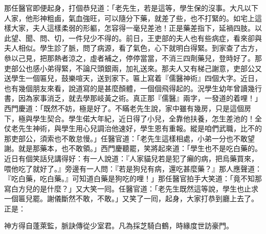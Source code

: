 那任醫官即便起身，打個恭兒道：「老先生，若是這等，學生保的沒事。大凡以下人家，他形神粗鹵，氣血強旺，可以隨分下藥，就差了些，也不打緊的。{}如宅上這樣大家，夫人這樣柔弱的形軀，怎容得一毫兒差池！正是藥差指下，延禍四肢。以此望、聞、問、切，一件兒少不得的。前日，王吏部的夫人也有些病症，看來卻與夫人相似。學生診了脈，問了病源，看了氣色，心下就明白得緊。到家查了古方，叅以己見，把那熱者涼之，虛者補之，停停當當，不消三四劑藥兒，登時好了。那吏部公也感小弟得緊，不論尺頭銀兩，加礼送來。那夫人又有梯己謝意，吏部公又送學生一個匾兒，鼓樂喧天，送到家下。匾上寫着『儒醫神術』四個大字。近日，也有幾個朋友來看，說道寫的是甚麼顏體，{}一個個飛得起的。況學生幼年曾讀幾行書，因為家事消乏，就去學那岐黃之術。真正那『儒醫』兩字，一發道的着哩！」{}西門慶道：「既然不妨，極是好了。不瞞老先生說，家中雖有幾房，只是這個房下，極與學生契合。學生偌大年紀，近日得了小兒，全靠他扶養，怎生差池的！全仗老先生神術，與學生用心兒調治他速好，學生恩有重報。縱是咱們武職，比不的那吏部公，{}須索也不敢怠慢。」任醫官道：「老先生這樣相處，小弟一分也不敢望謝。就是那藥本，也不敢領。」西門慶聽罷，笑將起來道：「學生也不是吃白藥的。近日有個笑話兒講得好：有一人說道：『人家貓兒若是犯了癩的病，把烏藥買來，喂他吃了就好了。』旁邊有一人問：『若是狗兒有病，還吃甚麼藥？』那人應聲道：『吃白藥，吃白藥。』可知道白藥是狗吃的哩！」那任醫官拍手大笑道：「竟不知那寫白方兒的是什麼？」又大笑一囘。任醫官道：「老先生既然這等說，學生也止求一個匾兒罷。謝儀斷然不敢，不敢。」又笑了一囘，起身，大家打恭到廳上去了。正是：

神方得自蓬萊監，脈訣傳從少室君。凡為採芝騎白鶴，時緣度世訪豪門。

